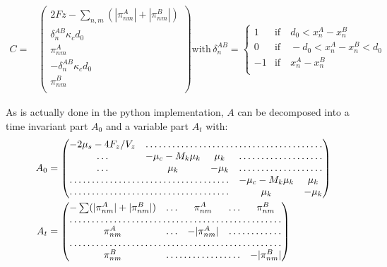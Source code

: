 \documentclass[a4paper,12pt]{article}
\begin{document}
\begin{equation}
\begin{aligned}
    C = &%
    \begin{pmatrix}
      2Fz - \sum_{n,m}(|\pi_{nm}^A| + |\pi_{nm}^B|) \\
      \delta_n^{AB} \kappa_c d_0\\
      \pi_{nm}^A\\
      -\delta_n^{AB} \kappa_c d_0\\
      \pi_{nm}^B\\
    \end{pmatrix}
    \mathrm{with}\, \delta_n^{AB} =%
    \begin{cases}
      1  &\mathrm{if}\quad d_0 < x_n^A - x_n^B\\
      0  &\mathrm{if}\quad - d_0 < x_n^A - x_n^B < d_0\\
      -1 &\mathrm{if}\quad  x_n^A - x_n^B\\
    \end{cases}
\end{aligned}
\end{equation}

As is actually done in the python implementation, 
$A$  can be decomposed into a time invariant part $A_0$ and a
variable part $A_t$ with:\\
\begin{equation}
  \begin{aligned}
    A_0 &=%
    \begin{pmatrix}
      - 2 \mu_s - 4 F_z/V_z & \hdotsfor{4}\\
      \hdots &  -\mu_c - M_k \mu_k& \mu_k & \hdotsfor{2}\\
      \hdots & \mu_k & - \mu_k & \hdotsfor{2}\\
      \hdotsfor{3} & -\mu_c - M_k \mu_k & \mu_k\\
      \hdotsfor{3} & \mu_k & - \mu_k\\
    \end{pmatrix}\\
    A_t &=%
    \begin{pmatrix}
      - \sum (|\pi_{nm}^A| + |\pi_{nm}^B|)& \hdots & \pi_{nm}^A &%
      \hdots &  \pi_{nm}^B\\
      \hdotsfor{5}\\
      \pi_{nm}^A & \hdots & - |\pi_{nm}^A| & \hdotsfor{2}\\
      \hdotsfor{5}\\
      \pi_{nm}^B & \hdotsfor{3} & - |\pi_{nm}^B| \\
    \end{pmatrix}\\
  \end{aligned}
\end{equation}
\end{document}
